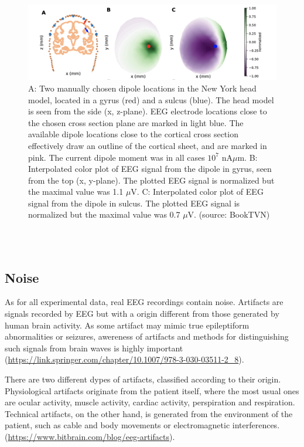 \documentclass[a4paper, UKenglish, 11pt]{uiomaster}
\begin{document}
\begin{figure}[!htb]
    \centering
    \includegraphics[width=\linewidth]{figures/gyrus_and_sulcus_EEG.png}
    \caption{A: Two manually chosen dipole locations in the New York head model, located in a gyrus (red) and a sulcus (blue). The head model is seen from the side (x, z-plane). EEG electrode locations close to the chosen cross section plane are marked in light blue. The available dipole locations close to the cortical cross section effectively draw an outline of the cortical sheet, and are marked in pink. The current dipole moment was in all cases $10^7$ nA$\mu$m. B: Interpolated color plot of EEG signal from the dipole in gyrus, seen from the top (x, y-plane). The plotted EEG signal is normalized but the maximal value was 1.1 $\mu$V. C: Interpolated color plot of EEG signal from the dipole in sulcus. The plotted EEG signal is normalized but the maximal value was 0.7 $\mu$V. (source: BookTVN)}
    \label{fig:gyrus_and_sulcus_EEG}
\end{figure}
\\
\\


\subsection{Noise}
As for all experimental data, real EEG recordings contain noise. Artifacts are signals recorded by EEG but with a origin different from those generated by human brain activity. As some artifact may mimic true epileptiform abnormalities or seizures, awereness of artifacts and methods for distinguishing such signals from brain waves is highly important (\url{https://link.springer.com/chapter/10.1007/978-3-030-03511-2_8}).

There are two different dypes of artifacts, classified according to their origin. Physiological artifacts originate from the patient itself, where the most usual ones are ocular activity, muscle activity, cardiac activity, perspiration and respiration. Technical artifacts, on the other hand, is generated from the environment of the patient, such as cable and body movements or electromagnetic interferences. (\url{https://www.bitbrain.com/blog/eeg-artifacts}).
\end{document}
